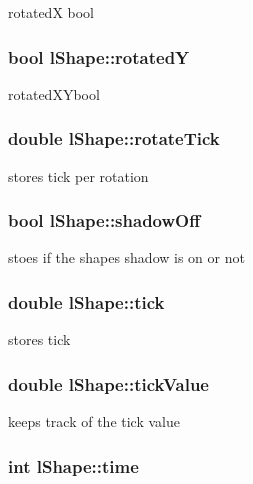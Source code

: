 rotated\-X bool \hypertarget{classl_shape_a5f7fc7e485ba77a6da02cafe7051e80e}{
\subsubsection[{rotated\-Y}]{\setlength{\rightskip}{0pt plus 5cm}bool l\-Shape\-::rotated\-Y}}\label{classl_shape_a5f7fc7e485ba77a6da02cafe7051e80e}
rotated\-X\-Ybool \hypertarget{classl_shape_a68fae9e0f7829a2fc5199e02fa6f8484}{
\subsubsection[{rotate\-Tick}]{\setlength{\rightskip}{0pt plus 5cm}double l\-Shape\-::rotate\-Tick}}\label{classl_shape_a68fae9e0f7829a2fc5199e02fa6f8484}
stores tick per rotation \hypertarget{classl_shape_a980e4a6708978a6427733e52872dbfbf}{
\subsubsection[{shadow\-Off}]{\setlength{\rightskip}{0pt plus 5cm}bool l\-Shape\-::shadow\-Off}}\label{classl_shape_a980e4a6708978a6427733e52872dbfbf}
stoes if the shapes shadow is on or not \hypertarget{classl_shape_a64a64d6d07aa239f0b09f28d00e2d0d5}{
\subsubsection[{tick}]{\setlength{\rightskip}{0pt plus 5cm}double l\-Shape\-::tick}}\label{classl_shape_a64a64d6d07aa239f0b09f28d00e2d0d5}
stores tick \hypertarget{classl_shape_a0168327856f77c68a8e7a5c15177778e}{
\subsubsection[{tick\-Value}]{\setlength{\rightskip}{0pt plus 5cm}double l\-Shape\-::tick\-Value}}\label{classl_shape_a0168327856f77c68a8e7a5c15177778e}
keeps track of the tick value \hypertarget{classl_shape_ad42de6d6c7dbb5adbadeb3b6e665acbc}{
\subsubsection[{time}]{\setlength{\rightskip}{0pt plus 5cm}int l\-Shape\-::time}}\label{classl_shape_ad42de6d6c7dbb5adbadeb3b6e665acbc}
